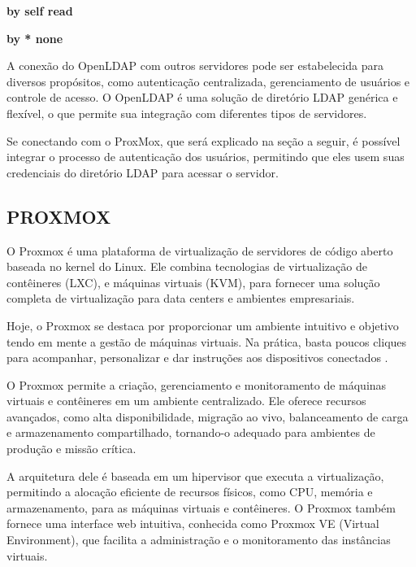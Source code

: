 \textbf{by self read}

\textbf{by * none}

A conexão do OpenLDAP com outros servidores pode ser estabelecida para diversos propósitos, como autenticação centralizada, gerenciamento de usuários e controle de acesso. O OpenLDAP é uma solução de diretório LDAP genérica e flexível, o que permite sua integração com diferentes tipos de servidores.

Se conectando com o ProxMox, que será explicado na seção a seguir, é possível integrar o processo de autenticação dos usuários, permitindo que eles usem suas credenciais do diretório LDAP para acessar o servidor.

\subsection{PROXMOX}

O Proxmox é uma plataforma de virtualização de servidores de código aberto baseada no kernel do Linux. Ele combina tecnologias de virtualização de contêineres (LXC), e máquinas virtuais (KVM), para fornecer uma solução completa de virtualização para data centers e ambientes empresariais.

Hoje, o Proxmox se destaca por proporcionar um ambiente intuitivo e objetivo tendo em mente a gestão de máquinas virtuais. Na prática, basta poucos cliques para acompanhar, personalizar e dar instruções aos dispositivos conectados \cite{oliveira2022vantagens}.

O Proxmox permite a criação, gerenciamento e monitoramento de máquinas virtuais e contêineres em um ambiente centralizado. Ele oferece recursos avançados, como alta disponibilidade, migração ao vivo, balanceamento de carga e armazenamento compartilhado, tornando-o adequado para ambientes de produção e missão crítica.

A arquitetura dele é baseada em um hipervisor que executa a virtualização, permitindo a alocação eficiente de recursos físicos, como CPU, memória e armazenamento, para as máquinas virtuais e contêineres. O Proxmox também fornece uma interface web intuitiva, conhecida como Proxmox VE (Virtual Environment), que facilita a administração e o monitoramento das instâncias virtuais.

